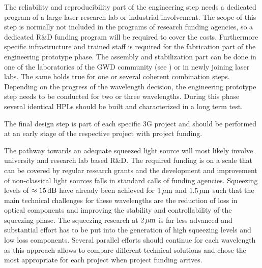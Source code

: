 The reliability and reproducibility part of the engineering step needs a dedicated program of a large laser research lab or industrial involvement. The scope of this step is normally not included in the programs of research funding agencies, so a dedicated R\&D funding program will be required to cover the costs.
Furthermore specific infrastructure and trained staff is required for the fabrication part of the engineering prototype phase. The assembly and stabilization part can be done in one of the laboratories of the GWD community (see \cite{LightSource_RD_table}) or in newly joining laser labs. The same holds true for one or several coherent combination steps. Depending on the progress of the wavelength decision, the engineering prototype step needs to be conducted for two or three wavelengths. During this phase several identical HPLs should be built and characterized in a long term test.

The final design step is part of each specific 3G project and should be performed at an early stage of the respective project with project funding.

The pathway towards an adequate squeezed light source will most likely involve university and research lab based R\&D. The required funding is on a scale that can be covered by regular research grants and the development and improvement of non-classical light sources falls in standard calls of funding agencies. Squeezing levels of $ \approx 15 \, {\rm dB} $ have already been achieved for  $ 1\, {\rm \mu m}$ and  $ 1.5\, {\rm \mu m}$ such that the main technical challenges for these wavelengths are the reduction of loss in optical components and improving the stability and controllability of the squeezing phase. The squeezing research at $ 2\, {\rm \mu m}$ is far less advanced and substantial effort has to be put into the generation of high squeezing levels and low loss components. Several parallel efforts should continue for each wavelength as this approach allows to compare different technical solutions and chose the most appropriate for each project when project funding arrives.

